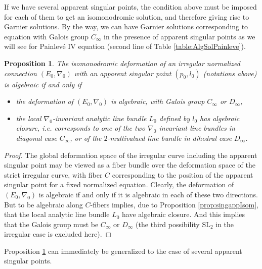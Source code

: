\documentclass[12]{amsart}
\newtheorem{prop}[thm]{Proposition}
\newcommand{\SL}{\mathrm{SL}_2}
\begin{document}
If we have several apparent singular points, the condition above must be imposed for each of them
to get an isomonodromic solution, and therefore giving rise to Garnier solutions.
By the way, we can have Garnier solutions corresponding to equation with Galois group $C_\infty$
in the presence of apparent singular points as we will see for Painlev\'e IV equation 
(second line of Table \ref{table:AlgSolPainleve}). 

\begin{prop}\label{prop:singappGarniersol}
The isomonodromic deformation of an irregular normalized connection $(E_0,\nabla_0)$
with an apparent singular point $(p_0,l_0)$ (notations above) is algebraic if and only if 
\begin{itemize}
\item the deformation of $(E_0,\nabla_0)$ is algebraic, with Galois group $C_\infty$ or $D_\infty$,
\item the local $\nabla_0$-invariant analytic line bundle $L_0$ defined by $l_0$ has algebraic closure,
i.e. corresponds to one of the two $\nabla_0$ invariant line bundles in diagonal case $C_\infty$,
or of the $2$-multivalued line bundle in dihedral case $D_\infty$.
\end{itemize}
\end{prop}

\begin{proof}The global deformation space of the irregular curve including the apparent singular point
may be viewed as a fiber bundle over the deformation space of the strict irregular curve, with fiber $C$
corresponding to the position of the apparent singular point for a fixed normalized equation.
Clearly, the deformation of $(E_0,\nabla_0)$ is algebraic if and only if it is algebraic in each of these two directions.  
But to be algebraic along $C$-fibers implies, due to Proposition \ref{prop:singappIsom}, that
the local analytic line bundle $L_0$ have algebraic closure. And this implies that the Galois group
must be $C_\infty$ or $D_\infty$ (the third possibility $\SL$ in the irregular case is excluded here).
\end{proof}

Proposition \ref{prop:singappGarniersol} can immediately be generalized to the case of several
apparent singular points.
\end{document}
